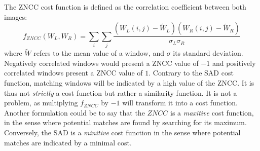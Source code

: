\begin{example}
	The ZNCC cost function is defined as the correlation coefficient between both images:
	\begin{equation}
		f_{ZNCC}(W_L, W_R)  = \sum_i\sum_j \frac{(W_L(i,j)  - \tilde{W}_L) (W_R(i,j)  - \tilde{W}_R) }{\sigma_L\sigma_R}
	\end{equation}
	where $\tilde{W}$ refers to the mean value of a window, and $\sigma$ its standard deviation. Negatively correlated windows would present a ZNCC value of $-1$ and positively correlated windows present a ZNCC value of $1$. Contrary to the SAD cost function, matching windows will be indicated by a high value of the ZNCC. It is thus not \textit{strictly} a cost function but rather a similarity function. It is not a problem, as multiplying $f_{ZNCC}$ by $-1$ will transform it into a cost function. Another formulation could be to say that the $ZNCC$ is a \textit{maxitive} cost function, in the sense where potential matches are found by searching for its maximum. Conversely, the SAD is a \textit{minitive} cost function in the sense where potential matches are indicated by a minimal cost.
	

\end{example}
